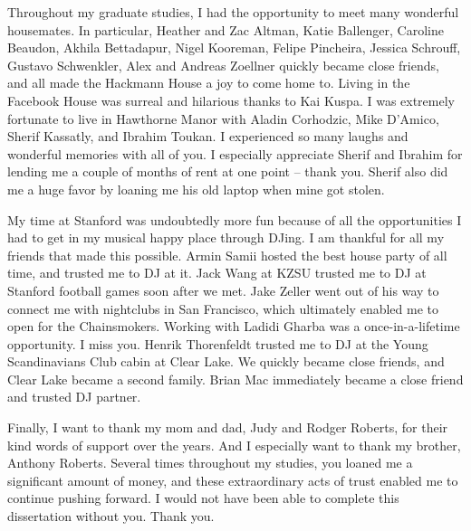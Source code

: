 Throughout my graduate studies, I had the opportunity to meet many wonderful housemates.
In particular, Heather and Zac Altman, Katie Ballenger, Caroline Beaudon, Akhila Bettadapur, Nigel Kooreman, Felipe Pincheira, Jessica Schrouff, Gustavo Schwenkler, Alex and Andreas Zoellner quickly became close friends, and all made the Hackmann House a joy to come home to.
Living in the Facebook House was surreal and hilarious thanks to Kai Kuspa.
I was extremely fortunate to live in Hawthorne Manor with  Aladin Corhodzic, Mike D'Amico, Sherif Kassatly, and Ibrahim Toukan.
I experienced so many laughs and wonderful memories with all of you.
I especially appreciate Sherif and Ibrahim for lending me a couple of months of rent at one point -- thank you.
Sherif also did me a huge favor by loaning me his old laptop when mine got stolen.

My time at Stanford was undoubtedly more fun because of all the opportunities I had to get in my musical happy place through DJing.
I am thankful for all my friends that made this possible.
Armin Samii hosted the best house party of all time, and trusted me to DJ at it.
Jack Wang at KZSU trusted me to DJ at Stanford football games soon after we met.
Jake Zeller went out of his way to connect me with nightclubs in San Francisco, which ultimately enabled me to open for the Chainsmokers.
Working with Ladidi Gharba was a once-in-a-lifetime opportunity.
I miss you.
Henrik Thorenfeldt trusted me to DJ at the Young Scandinavians Club cabin at Clear Lake.
We quickly became close friends, and Clear Lake became a second family.
Brian Mac immediately became a close friend and trusted DJ partner.

Finally, I want to thank my mom and dad, Judy and Rodger Roberts, for their kind words of support over the years.
And I especially want to thank my brother, Anthony Roberts.
Several times throughout my studies, you loaned me a significant amount of money, and these extraordinary acts of trust enabled me to continue pushing forward.
I would not have been able to complete this dissertation without you.
Thank you.
